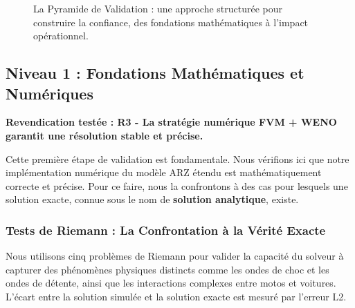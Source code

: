 \begin{figure}[htbp]
    \centering
    \caption{La Pyramide de Validation : une approche structurée pour construire la confiance, des fondations mathématiques à l'impact opérationnel.}
    \label{fig:pyramide_validation}
\end{figure}


\subsection{Niveau 1 : Fondations Mathématiques et Numériques}
\label{sec:validation_fondations}

\textbf{Revendication testée : R3 - La stratégie numérique FVM + WENO garantit une résolution stable et précise.}

Cette première étape de validation est fondamentale. Nous vérifions ici que notre implémentation numérique du modèle ARZ étendu est mathématiquement correcte et précise. Pour ce faire, nous la confrontons à des cas pour lesquels une solution exacte, connue sous le nom de \textbf{solution analytique}, existe.

\subsubsection{Tests de Riemann : La Confrontation à la Vérité Exacte}
\label{subsec:tests_riemann}

Nous utilisons cinq problèmes de Riemann pour valider la capacité du solveur à capturer des phénomènes physiques distincts comme les ondes de choc et les ondes de détente, ainsi que les interactions complexes entre motos et voitures. L'écart entre la solution simulée et la solution exacte est mesuré par l'erreur L2.

